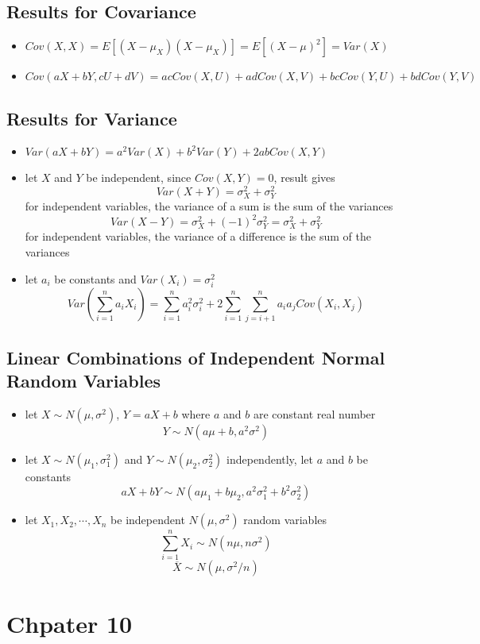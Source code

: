 \documentclass[11pt]{article}
\begin{document}
\subsection{Results for Covariance}
\begin{itemize}
    \item $Cov(X,X) = E[(X-\mu_X)(X-\mu_X)] = E[(X-\mu)^2] = Var(X)$
    \item $Cov(aX+bY, cU+dV) = acCov(X,U)+adCov(X,V)+bcCov(Y,U)+bdCov(Y,V)$
\end{itemize}
\subsection{Results for Variance}
\begin{itemize}
    \item $Var(aX+bY)=a^2Var(X)+b^2Var(Y)+2abCov(X,Y)$
    \item let $X$ and $Y$ be independent, since $Cov(X,Y)=0$, result gives 
    \[Var(X+Y)=\sigma_X^2+\sigma_Y^2\]
    for independent variables, the variance of a sum is the sum of the variances
    \[Var(X-Y)=\sigma_X^2+(-1)^2\sigma_Y^2 = \sigma_X^2+\sigma_Y^2\]
    for independent variables, the variance of a difference is the sum of the variances 
    \item let $a_i$ be constants and $Var(X_i)=\sigma_i^2$
    \[Var(\sum_{i=1}^{n}a_iX_i) = \sum_{i=1}^{n}a_i^2\sigma_i^2 + 2\sum_{i=1}^{n}\sum_{j=i+1}^{n}a_ia_jCov(X_i,X_j)\]
\end{itemize}
\subsection{Linear Combinations of Independent Normal Random Variables}
\begin{itemize}
    \item let $X\sim N(\mu,\sigma^2)$, $Y=aX+b$ where $a$ and $b$ are constant real number 
    \[Y\sim N(a\mu+b,a^2\sigma^2)\]
    \item let $X\sim N(\mu_1,\sigma_1^2)$ and $Y\sim N(\mu_2,\sigma_2^2)$ independently, let $a$ and $b$ be constants 
    \[aX+bY\sim N(a\mu_1+b\mu_2, a^2\sigma_1^2+b^2\sigma_2^2)\]
    \item let $X_1,X_2,\cdots,X_n$ be independent $N(\mu,\sigma^2)$ random variables
    \[\sum_{i=1}^{n}X_i\sim N(n\mu,n\sigma^2)\]
    \[\overline{X}\sim N(\mu,\sigma^2/n)\]
\end{itemize}

\section{Chpater 10}
\end{document}
